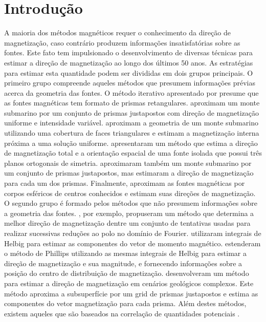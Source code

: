 \chapter{Introdução}
\label{chap:introducao}

A maioria dos métodos magnéticos requer o conhecimento da direção de magnetização, caso contrário produzem informações insatisfatórias sobre as fontes. Este fato tem impulsionado o desenvolvimento de diversas técnicas para estimar a direção de magnetização ao longo dos últimos 50 anos. As estratégias para estimar esta quantidade 
podem ser divididas em dois grupos principais. O primeiro grupo compreende aqueles métodos que presumem informações prévias acerca da geometria das fontes. O método iterativo apresentado por \cite{bhattacharyya1966} presume que as fontes magnéticas tem formato de prismas retangulares. \cite{emilia_massey_1974} aproximam um monte submarino por um conjunto de prismas justapostos com direção de magnetização uniforme e intensidade variável. \cite{parker_etal_1987} aproximam a geometria de um monte submarino utilizando uma cobertura de faces triangulares e estimam a magnetização interna próxima a uma solução uniforme. \cite{medeiros_silva_1995} apresentaram 
um método que estima a direção de magnetização total e a orientação espacial de uma fonte isolada que possui três planos ortogonais de simetria. \cite{kubota2005} aproximaram também um monte submarino por um conjunto de prismas justapostos, mas estimaram a direção de magnetização para cada um dos prismas. Finalmente, \cite{oliveirajr_etal_2015} aproximam as fontes magnéticas por corpos esféricos de centros conhecidos e estimam suas direções de magnetização. O segundo grupo é formado pelos métodos que não presumem informações sobre a geometria das fontes. \cite{fedi_etal_1994}, por exemplo, propuseram um método que determina a melhor 
direção de magnetização dentre um conjunto de tentativas usadas para realizar sucessivas reduções ao polo no domínio de Fourier. \cite{phillips2005} utilizaram integrais de Helbig para estimar as componentes do vetor de momento magnético. \cite{tontini_pedersen_2008} estenderam o método de Phillips utilizando as mesmas 
integrais de Helbig para estimar a direção de magnetização e sua magnitude, e fornecendo informações sobre a posição do centro de distribuição de magnetização. \cite{lelievre_oldenburg_2009} desenvolveram um método para estimar a direção de magnetização em cenários geológicos complexos. Este método aproxima a subsuperfície por um grid de prismas justapostos e estima as componentes do vetor magnetização para cada prisma. Além destes métodos, existem aqueles que são baseados na correlação de quantidades potenciais \citep[e.g.,][]{dannemiller_li_2006,gerovska_etal_2009,liu_etal_2015,zhang_etal_2018}. 

